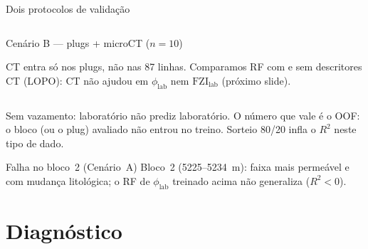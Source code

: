 \documentclass[aspectratio=169,10pt]{beamer}
\newcommand{\philab}{\ensuremath{\phi_{\mathrm{lab}}}}
\newcommand{\fzilab}{\ensuremath{\mathrm{FZI}_{\mathrm{lab}}}}
\begin{document}
\begin{frame}{Dois protocolos de validação}
\begin{columns}[T,onlytextwidth]
\begin{exampleblock}{Cenário B --- plugs + microCT ($n=10$)}
      \centering
      \vspace{0.06cm}

      {\tiny
      CT entra só nos plugs, não nas 87 linhas.
      Comparamos RF com e sem descritores CT (LOPO): CT não ajudou
      em \philab{} nem \fzilab{} (próximo slide).}
    \end{exampleblock}
  \end{columns}

  \vspace{-0.10cm}
  {\scriptsize
  Sem vazamento: laboratório não prediz laboratório.
  O número que vale é o OOF: o bloco (ou o plug) avaliado não entrou
  no treino. Sorteio 80/20 infla o $R^2$ neste tipo de dado.}

  \vspace{-0.22cm}
  \begin{block}{Falha no bloco~2 (Cenário~A)}
    \scriptsize Bloco~2 (5225--5234~m): faixa mais permeável e com mudança
    litológica; o RF de \philab{} treinado acima não generaliza ($R^2<0$).
  \end{block}
\end{frame}

\section{Diagnóstico}
\end{document}
